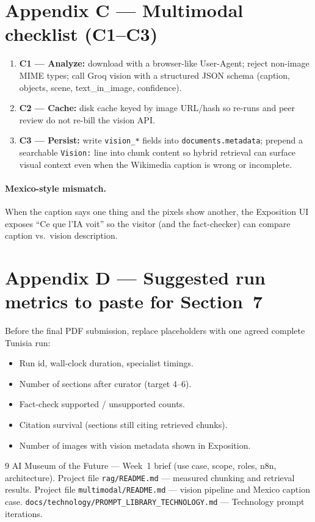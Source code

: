 \documentclass[11pt,a4paper]{article}
\begin{document}
\section*{Appendix C --- Multimodal checklist (C1--C3)}
\begin{enumerate}
  \item \textbf{C1 --- Analyze:} download with a browser-like User-Agent; reject non-image MIME types; call Groq vision with a structured JSON schema (caption, objects, scene, text\_in\_image, confidence).
  \item \textbf{C2 --- Cache:} disk cache keyed by image URL/hash so re-runs and peer review do not re-bill the vision API.
  \item \textbf{C3 --- Persist:} write \texttt{vision\_*} fields into \texttt{documents.metadata}; prepend a searchable \texttt{Vision:} line into chunk content so hybrid retrieval can surface visual context even when the Wikimedia caption is wrong or incomplete.
\end{enumerate}
\paragraph{Mexico-style mismatch.}
When the caption says one thing and the pixels show another, the Exposition UI exposes ``Ce que l'IA voit'' so the visitor (and the fact-checker) can compare caption vs.\ vision description.

\section*{Appendix D --- Suggested run metrics to paste for Section~7}
Before the final PDF submission, replace placeholders with one agreed complete Tunisia run:
\begin{itemize}
  \item Run id, wall-clock duration, specialist timings.
  \item Number of sections after curator (target 4--6).
  \item Fact-check supported / unsupported counts.
  \item Citation survival (sections still citing retrieved chunks).
  \item Number of images with vision metadata shown in Exposition.
\end{itemize}

\begin{thebibliography}{9}
 AI Museum of the Future --- Week~1 brief (use case, scope, roles, n8n, architecture).
 Project file \texttt{rag/README.md} --- measured chunking and retrieval results.
 Project file \texttt{multimodal/README.md} --- vision pipeline and Mexico caption case.
 \texttt{docs/technology/PROMPT\_LIBRARY\_TECHNOLOGY.md} --- Technology prompt iterations.
\end{thebibliography}
\end{document}
